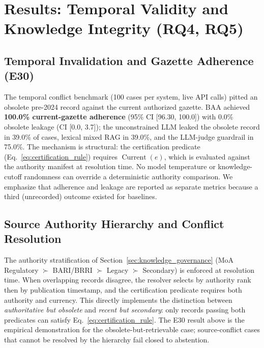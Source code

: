 \section{Results: Temporal Validity and Knowledge Integrity (RQ4, RQ5)}
\label{sec:results_temporal_governance}

\subsection{Temporal Invalidation and Gazette Adherence (E30)}
The temporal conflict benchmark (100 cases per system, live API calls) pitted an obsolete pre-2024 record against the current authorized gazette. BAA achieved \textbf{100.0\% current-gazette adherence} (95\% CI [96.30, 100.0]) with 0.0\% obsolete leakage (CI [0.0, 3.7]); the unconstrained LLM leaked the obsolete record in 39.0\% of cases, lexical mixed RAG in 39.0\%, and the LLM-judge guardrail in 75.0\%. The mechanism is structural: the certification predicate (Eq.~\ref{eq:certification_rule}) requires $\operatorname{Current}(e)$, which is evaluated against the authority manifest at resolution time. No model temperature or knowledge-cutoff randomness can override a deterministic authority comparison. We emphasize that adherence and leakage are reported as separate metrics because a third (unrecorded) outcome existed for baselines.

\subsection{Source Authority Hierarchy and Conflict Resolution}
The authority stratification of Section~\ref{sec:knowledge_governance} (MoA Regulatory $\succ$ BARI/BRRI $\succ$ Legacy $\succ$ Secondary) is enforced at resolution time. When overlapping records disagree, the resolver selects by authority rank then by publication timestamp, and the certification predicate requires both authority and currency. This directly implements the distinction between \emph{authoritative but obsolete} and \emph{recent but secondary}: only records passing both predicates can satisfy Eq.~\eqref{eq:certification_rule}. The E30 result above is the empirical demonstration for the obsolete-but-retrievable case; source-conflict cases that cannot be resolved by the hierarchy fail closed to abstention.


